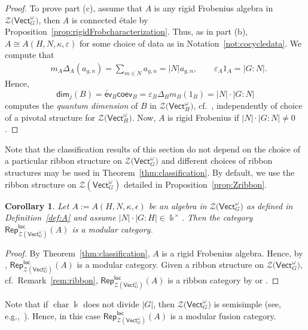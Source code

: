 \documentclass[10pt,a4paper]{amsart}
\numberwithin{equation}{section}
\newtheorem{Corollary}[Theorem]{Corollary}
\newcommand{\cha}{\operatorname{char}}
\newcommand{\coev}{\mathsf{coev}}
\newcommand{\evr}{\widetilde{\mathsf{ev}}}
\renewcommand{\dim}{\mathsf{dim}}
\newcommand{\locmod}{\mathsf{Rep}^{\mathsf{loc}}}
\newcommand{\Vect}{\mathsf{Vect}}
\newcommand{\cZ}{\mathcal{Z}}
\begin{document}
\begin{proof}
To prove part (c), assume that $A$ is any rigid Frobenius algebra in $\cZ\big(\Vect_G^\omega\big)$, then $A$ is connected \'etale by Proposition~\ref{prop:rigidFrobcharacterization}. Thus, as in part (b), $A\cong A(H,N,\kappa, \varepsilon)$ for some choice of data as in Notation~\ref{not:cocycledata}.
We compute that
\begin{align*}
& m_A\Delta_A(a_{g,n})=\sum_{m\in N}a_{g,n}=|N| a_{g,n},\qquad
 \varepsilon_A 1_A = |G : N|.
\end{align*}
Hence,
\[\dim_j(B)=\evr_B \coev_B=\varepsilon_B\Delta_Bm_B(1_B)=|N|\cdot |G : N|\]
computes the \emph{quantum dimension} of $B$ in $\cZ\big(\Vect_H^\omega\big)$, cf.\ \cite[equation (3.7)]{LW3}, independently of choice of a pivotal structure for $\cZ\big(\Vect_H^\omega\big)$. Now, $A$ is rigid Frobenius if $|N|\cdot |G : N|\neq 0$.
\end{proof}


\begin{Remark}\label{rem:ribbon}
Note that the classification results of this section do not depend on the choice of a particular ribbon structure on $\cZ\big(\Vect_G^\omega\big)$ and different choices of ribbon structures may be used in Theorem~\ref{thm:classification}. By default, we use the ribbon structure on $\cZ(\Vect_{G}^\omega)$ detailed in Proposition~\ref{prop:Zribbon}.
\end{Remark}

\begin{Corollary}\label{cor:modular}
Let $A:=A(H,N,\kappa,\epsilon)$ be an algebra in $\cZ\big(\Vect_G^\omega\big)$ as defined in Definition~{\rm \ref{def:A}} and assume $|N|\cdot |G:H|\in \Bbbk^\times$.
Then the category $\locmod_{\cZ(\Vect_{G}^\omega)}(A)$ is a modular category.
\end{Corollary}
\begin{proof}
By Theorem~\ref{thm:classification}, $A$ is a rigid Frobenius algebra. Hence, by \cite[Theorem 4.12]{LW3}, $\locmod_{\cZ(\Vect_{G}^\omega)}(A)$ is a modular category. Given a ribbon structure on $\cZ\big(\Vect_G^\omega\big)$, cf.\ Remark~\ref{rem:ribbon}, $\locmod_{\cZ(\Vect_{G}^\omega)}(A)$ is a ribbon category by \cite[1.17.~Theorem]{KO} or \cite[Proposition~4.18]{LW3}.
\end{proof}

Note that if $\cha \Bbbk$ does not divide $|G|$, then $\cZ\big(\Vect_G^\omega\big)$ is semisimple (see, e.g.,~\cite[Corollary~13.2.3]{Rad}). Hence, in this case $\locmod_{\cZ(\Vect_{G}^\omega)}(A)$ is a modular fusion category.
\end{document}
